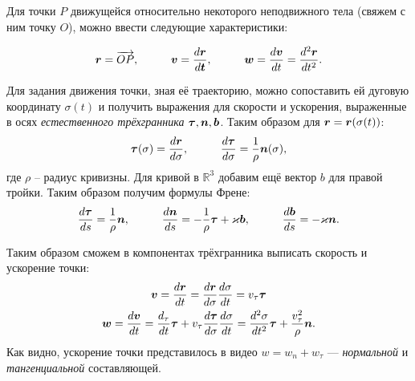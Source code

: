 Для точки $P$ движущейся относительно некоторого неподвижного тела (свяжем с ним точку $O$), можно ввести следующие характеристики:
\begin{to_def}
	\begin{equation*}
	\mbox{\boldmath $r$} = \overrightarrow{O P},
	\hspace*{1 cm}
	\mbox{\boldmath $v$} = \frac{d \mbox{\boldmath $r$}}{d \mbox{\boldmath $t$}},
	\hspace*{1 cm}
	\mbox{\boldmath $w$} =  \frac{d \mbox{\boldmath $v$}}{d t} = \frac{d^2 \mbox{\boldmath $r$}}{d t^2}.
\end{equation*}	
\end{to_def}

\begin{to_def}
	Для задания движения точки, зная её траекторию, можно сопоставить ей дуговую координату $\sigma (t)$ и получить выражения для скорости и ускорения, выраженные в осях \textit{естественного трёхгранника} $\mbox{\boldmath $\tau$}, \mbox{\boldmath $n$}, \mbox{\boldmath $b$}$.
	Таким образом для $\mbox{\boldmath $r$} = \mbox{\boldmath $r$}(\sigma(t))$:
	\begin{equation*}
		\mbox{\boldmath $\tau$} (\sigma) = \frac{d \mbox{\boldmath $r$}}{d \sigma}, 
		\hspace*{1 cm} 
		\frac{d \mbox{\boldmath $\tau$}}{d \sigma} = \frac{1}{\rho} \mbox{\boldmath $n$} (\sigma),
	\end{equation*}
	где $\rho$ -- радиус кривизны. Для кривой в $\mathbb{R}^3$ добавим ещё вектор $b$ для правой тройки. Таким образом получим формулы Френе:
	\begin{equation*}
		\frac{d \mbox{\boldmath $\tau$}}{d s} = \frac{1}{\rho} \mbox{\boldmath $n$},
		\hspace*{1 cm}
		\frac{d \mbox{\boldmath $n$}}{d s} = - \frac{1}{\rho} \mbox{\boldmath $\tau$} + \varkappa \mbox{\boldmath $b$},
		\hspace*{1 cm}
		\frac{d \mbox{\boldmath $b$}}{d s} = - \varkappa \mbox{\boldmath $n$}.
	\end{equation*}
\end{to_def}

Таким образом сможем в компонентах трёхгранника выписать скорость и ускорение точки:
\begin{gather*}
   \mbox{\boldmath $v$} = \frac{d \mbox{\boldmath $r$}}{d t} = \frac{d \mbox{\boldmath $r$}}{d \sigma} \frac{d \sigma}{d t} = v_\tau \mbox{\boldmath $\tau$}
   \\
   \mbox{\boldmath $w$} = \frac{d \mbox{\boldmath $v$}}{d t} = \frac{d_\tau}{d t} \mbox{\boldmath $\tau$} + v_\tau \frac{d \mbox{\boldmath $\tau$}}{d \sigma} \frac{d \sigma}{d t} = \frac{d^2 \sigma}{d t^2} \mbox{\boldmath $\tau$} + \frac{v_\tau^2}{\rho} \mbox{\boldmath $n$}.
\end{gather*}
Как видно, ускорение точки представилось в видео $w = w_n + w_\tau $ --- \textit{нормальной} и \textit{тангенциальной} составляющей.

